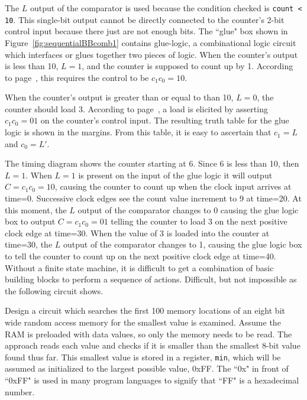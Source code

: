 The $L$ output of the comparator is used because the condition checked is 
\verb+count < 10+.  This single-bit output cannot be directly connected to the
counter's 2-bit control input because there just are not enough bits.  The
``glue" box shown in Figure~\ref{fig:sequentialBBcomb1} contains glue-logic, a
combinational logic circuit which interfaces or glues together two pieces
of logic.  When the counter's output is less than 10, $L=1$, and the
counter is supposed to count up by 1.  According to 
page~\pageref{page:counter}, this requires the control to be $c_1c_0=10$.

When the counter's output is greater than or equal to than 10, $L=0$, 
the counter should load 3.  According to 
page~\pageref{page:counter}, a load is elicited by asserting 
$c_1c_0=01$ on the counter's control input.  The 
resulting truth table for the glue logic is shown in the margins.  
From this table, it is easy to ascertain that $c_1 = L$ and $c_0 = L'$.


The timing diagram shows the counter starting at 6.  Since 6 is less 
than 10, then $L=1$.  When $L=1$ is present on the input of the
glue logic it will output $C=c_1c_0=10$, causing the counter
to count up when the clock input arrives at time=0.  Successive clock edges
see the count value increment to 9 at time=20.  At this moment, the $L$ output
of the comparator changes to 0 causing the glue logic box to output 
$C=c_1c_0=01$ telling the counter to load 3 on the next positive clock edge 
at time=30.  When the value of 3 is loaded into the counter at time=30, the
$L$ output of the comparator changes to 1, causing the glue logic box to
tell the counter to count up on the next positive clock edge at time=40.
Without a finite state machine, it is difficult to get a combination of basic 
building blocks to perform a sequence of actions. Difficult, but not 
impossible as the following circuit shows.
 
Design a circuit which searches the first 
100 memory locations of an eight bit wide random access memory for the smallest 
value is examined.  Assume the RAM is preloaded with data values, so 
only the memory needs to be read.  The approach reads each value 
and checks if it is smaller than the smallest 8-bit value found
thus far.  This smallest value is stored in a register, \verb+min+, which
will be assumed as initialized to the largest possible value, 0xFF.  The ``0x"
in front of ``0xFF" is used in many program languages to signify that 
``FF" is a hexadecimal number.
\label{page:minsearch} 

